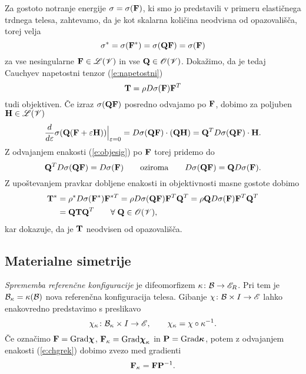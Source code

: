 Za gostoto notranje energije $\sigma=\sigma(\mathbf F)$, ki smo jo predstavili v primeru
elastičnega trdnega telesa, zahtevamo, da je kot skalarna količina neodvisna
od opazovališča, torej velja
\begin{equation} \label{e:objesig}
	\sigma^*=\sigma(\mathbf F^*)=\sigma(\mathbf Q\mathbf F)=\sigma(\mathbf F)
\end{equation}
za vse nesingularne $\mathbf F\in\mathscr L(\mathscr V)$ in vse $\mathbf Q\in\mathscr{O}(\mathscr V)$.
Dokažimo, da je tedaj Cauchyev napetostni tenzor (\ref{e:napetostni})
\[
	\mathbf T=\rho D\sigma(\mathbf F)\mathbf F^T
\]
tudi objektiven. Če izraz $\sigma(\mathbf Q\mathbf F)$ posredno odvajamo po $\mathbf F$,
dobimo za poljuben $\mathbf H\in\mathscr L(\mathscr V)$
\[
	\frac{d}{d\varepsilon}\sigma(\mathbf Q(\mathbf F+\varepsilon\mathbf H))\Big|_{\varepsilon=0}
	=D\sigma(\mathbf Q\mathbf F)\cdot(\mathbf Q\mathbf H)=\mathbf Q^T D\sigma(\mathbf Q\mathbf F)\cdot\mathbf H.
\]
Z odvajanjem enakosti (\ref{e:objesig}) po $\mathbf F$ torej pridemo do
\[
	\mathbf Q^T D\sigma(\mathbf Q\mathbf F) = D\sigma(\mathbf F)\qquad\textrm{oziroma}
	\qquad D\sigma(\mathbf Q\mathbf F) = \mathbf QD\sigma(\mathbf F).
\]
Z upoštevanjem pravkar dobljene enakosti in objektivnosti masne gostote dobimo
\begin{align*}
	\mathbf T^*&=\rho^* D\sigma(\mathbf F^*)\mathbf F^{*T}
	=\rho D\sigma(\mathbf Q\mathbf F)\mathbf F^{T}\mathbf Q^{T}
	=\rho \mathbf Q D\sigma(\mathbf F)\mathbf F^{T}\mathbf Q^{T} \nonumber \\
	&=\mathbf Q\mathbf T\mathbf Q^{T}\qquad\forall\;\mathbf Q\in\mathscr{O}(\mathscr V),
\end{align*}
kar dokazuje, da je $\mathbf T$ neodvisen od opazovališča.


\subsection{Materialne simetrije}


\emph{Sprememba referenčne konfiguracije} je difeomorfizem $\kappa\colon\mathcal B\to\mathscr E_R$.
Pri tem je $\mathcal B_{\kappa}=\kappa(\mathcal B)$ nova referenčna konfiguracija telesa. Gibanje
$\chi\colon\mathcal B\times I\to\mathscr E$ lahko enakovredno predstavimo s preslikavo
\begin{equation} \label{e:chgrek}
	\chi_{\kappa}\colon\mathcal B_{\kappa}\times I\to\mathscr E, \qquad
	\chi_{\kappa}=\chi\circ\kappa^{-1}.
\end{equation}
Če označimo $\mathbf F=\mathrm{Grad}\boldsymbol \chi$, $\mathbf F_{\kappa}=\mathrm{Grad}\boldsymbol \chi_{\kappa}$
in $\mathbf P=\mathrm{Grad}\boldsymbol \kappa$, potem z odvajanjem enakosti (\ref{e:chgrek})
dobimo zvezo med gradienti
\[
	\mathbf F_{\kappa}=\mathbf F\mathbf P^{-1}.
\]

